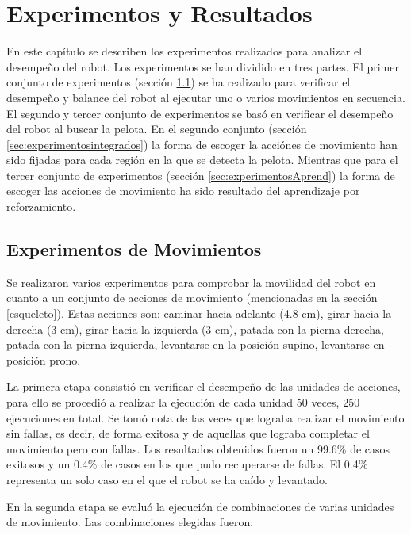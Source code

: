 \chapter{Experimentos y Resultados}\label{chapter:resultados}
En este capítulo se describen los experimentos realizados para analizar el desempeño del robot. Los experimentos se han dividido en tres partes. El primer conjunto de experimentos (sección \ref{sec:experimentosMov}) se ha realizado para verificar el desempeño y balance del robot al ejecutar uno o varios movimientos en secuencia. El segundo y tercer conjunto de experimentos se bas\'o en verificar el desempeño del robot al buscar la pelota. En el segundo conjunto (sección \ref{sec:experimentosintegrados}) la forma de escoger la acciónes de movimiento han sido fijadas para cada región en la que se detecta la pelota. Mientras que para el tercer conjunto de experimentos (secci\'on \ref{sec:experimentosAprend}) la forma de escoger las acciones de movimiento ha sido resultado del aprendizaje por reforzamiento. 
 
\section{Experimentos de Movimientos}\label{sec:experimentosMov}

Se realizaron varios experimentos para comprobar la movilidad del robot en cuanto a un conjunto de acciones de movimiento (mencionadas en la sección \ref{esqueleto}). Estas acciones son: caminar hacia adelante (4.8 cm), girar hacia la derecha (3 cm), girar hacia la izquierda (3 cm), patada con la pierna derecha, patada con la pierna izquierda, levantarse en la posición supino, levantarse en posición prono.

La primera etapa consistió en verificar el desempeño de las unidades de acciones, para ello se procedió a realizar la ejecución de cada unidad 50 veces, 250 ejecuciones en total. Se tomó nota de las veces que lograba realizar el movimiento sin fallas, es decir, de forma exitosa y de aquellas que lograba completar el movimiento pero con fallas. Los resultados obtenidos fueron un 99.6\% de casos exitosos y un 0.4\% de casos en los que pudo recuperarse de fallas. El 0.4\% representa un solo caso en el que el robot se ha caído y levantado.  

En la segunda etapa se evalu\'o la ejecuci\'on de combinaciones de varias unidades de movimiento. Las combinaciones elegidas fueron: 

